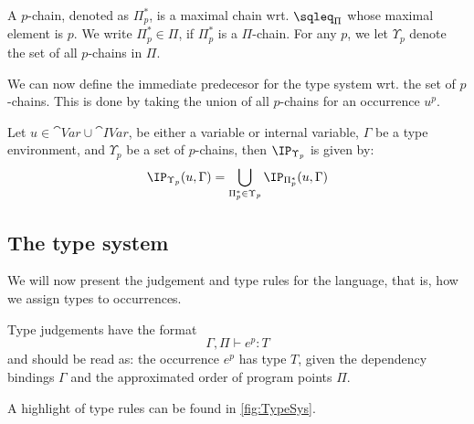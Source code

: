 \documentclass{eptcs}
\begin{document}

\begin{definition}[$p$-chains]
  A $p$-chain, denoted as $\Pi_p^{*}$, is a maximal chain
  wrt. $\sqleq_\Pi$ whose maximal element is $p$. We write
  $\Pi_p^{*}\in\Pi$, if $\Pi_p^{*}$ is a $\Pi$-chain. For any $p$, we
  let $\Upsilon_p$ denote the set of all $p$-chains in $\Pi$.
\end{definition}


We can now define the immediate predecesor for the type system wrt. the set of $p$-chains.
This is done by taking the union of all $p$-chains for an occurrence $u^p$.

\begin{definition}\label{def:GBindUps}
	Let $u\in \cat{Var}\cup\cat{IVar}$, be either a variable or internal variable, $\Gamma$ be a type environment, and $\Upsilon_p$ be a set of $p$-chains, then $\IP_{\Upsilon_p}$ is given by:
\[
  \IP_{\Upsilon_p}(u,\Gamma)=\bigcup_{\Pi_p^{*}\in\Upsilon_p}\IP_{\Pi_p^{*}}(u,\Gamma) \]
\end{definition}



\subsection{The type system}\label{sec:Judge}
We will now present the judgement and type rules for the language, that is, how we assign types to occurrences.

Type judgements have the format
%
\[ \Gamma,\Pi\vdash e^p: T \]
%
and should be read as: the occurrence $e^p$ has type $T$, given the
dependency bindings $\Gamma$ and the approximated order of program
points $\Pi$. 

A highlight of type rules can be found in \cref{fig:TypeSys}.
\end{document}
